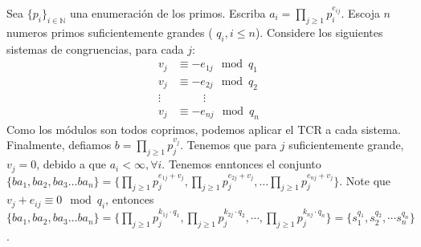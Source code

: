 \begin{sol}
	Sea $\{p_{i}\}_{i\in \mathbb{N}}$ una enumeraci\'on de los primos. Escriba $a_{i} = \prod_{j\geq1} p_{i}^{e_{ij}}$.%
	 Escoja $n$ numeros primos suficientemente grandes ( $q_{i}, i\leq n$). Considere los siguientes sistemas de congruencias, para cada $j$:
	\begin{align}
	v_{j} &\equiv -e_{1j} \mod q_{1} \\
	v_{j} & \equiv -e_{2j} \mod q_{2} \\
	\vdots & \hspace{1cm} \vdots \\
	v_{j} & \equiv -e_{nj} \mod q_{n}
	\end{align}
	Como los m\'odulos son todos coprimos, podemos aplicar el TCR a cada sistema. Finalmente, defiamos $b = \prod_{j\geq 1} p_{j}^{v_{j}}$. Tenemos que para $j$ suficientemente grande, $v_{j} = 0$, debido a que $a_{i} < \infty, \forall i$. Tenemos enntonces el conjunto $\{ba_{1}, ba_{2}, ba_{3} \dots ba_{n}\} = \{  \prod_{j\geq1} p_{j}^{e_{1j}+v_{j}}, \prod_{j\geq1} p_{j}^{e_{2j} + v_{j}}, \dots \prod_{j\geq1} p_{j}^{e_{nj}+v_{j}}  \}$. Note que $v_{j} +e_{ij} \equiv 0 \mod q_{i}$, entonces $\{ba_{1}, ba_{2}, ba_{3} \dots ba_{n}\} = \{ \prod_{j\geq1} p_{j}^{k_{1j}\cdot q_{1}}, \prod_{j\geq1} p_{j}^{k_{2j} \cdot q_{2}} , \cdots, \prod_{j\geq1} p_{j}^{k_{nj}\cdot q_{n}}  \} = \{ s_{1}^{q_{1}}, s_{2}^{q_{2}}, \cdots s_{n}^{q_{n} } \}$.
\end{sol}